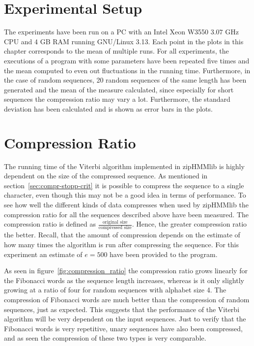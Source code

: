 \section{Experimental Setup}

The experiments have been run on a PC with an Intel Xeon W3550 $3.07$ GHz CPU
and 4 GB RAM running GNU/Linux 3.13. Each point in the plots in this chapter
corresponds to the mean of multiple runs. For all experiments, the executions
of a program with some parameters have been repeated five times and the mean
computed to even out fluctuations in the running time. Furthermore, in the case
of random sequences, 20 random sequences of the same length has been generated
and the mean of the measure calculated, since especially for short sequences
the compression ratio may vary a lot. Furthermore, the standard deviation has
been calculated and is shown as error bars in the plots.

\section{Compression Ratio} 
\label{sec:compression-ratio}

The running time of the Viterbi algorithm implemented in zipHMMlib is highly
dependent on the size of the compressed sequence. As mentioned in
section~\ref{sec:compr-stopp-crit} it is possible to compress the sequence to a
single character, even though this may not be a good idea in terms of
performance. To see how well the different kinds of data compresses when used
by zipHMMlib the compression ratio for all the sequences described above have
been measured. The compression ratio is defined as
$\frac{\text{original size}}{\text{compressed size}}$. Hence, the greater
compression ratio the better. Recall, that the amount of compression depends on
the estimate of how many times the algorithm is run after compressing the
sequence. For this experiment an estimate of $e = 500$ have been provided to
the program.

As seen in figure~\ref{fig:compression_ratio} the compression ratio grows
linearly for the Fibonacci words as the sequence length increases, whereas is
it only slightly growing at a ratio of four for random
sequences with alphabet size 4. The compression of Fibonacci words are much
better than the compression of random sequences, just as expected. This
suggests that the performance of the Viterbi algorithm will be very dependent
on the input sequences. Just to verify that the Fibonacci words is very
repetitive, unary sequences have also been compressed, and as seen the
compression of these two types is very comparable.

